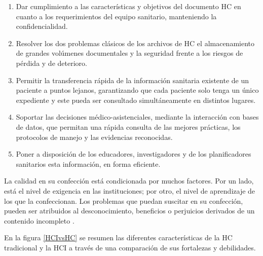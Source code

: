 \begin{enumerate}
	\item Dar cumplimiento a las características y objetivos del documento HC en cuanto a los requerimientos del equipo sanitario, manteniendo la confidencialidad.  
	
	\item Resolver los dos problemas clásicos de los archivos de HC el almacenamiento de grandes volúmenes documentales y la seguridad frente a los riesgos de pérdida y de deterioro.  
	
	\item Permitir la transferencia rápida de la información sanitaria existente de un paciente a puntos lejanos, garantizando que cada paciente solo tenga un único expediente y este pueda ser consultado simultáneamente en distintos lugares.  
	
	\item Soportar las decisiones médico-asistenciales, mediante la interacción con bases de datos, que permitan una rápida consulta de las mejores prácticas, los protocolos de manejo y las evidencias reconocidas.  
	
	\item Poner a disposición de los educadores, investigadores y de los planificadores sanitarios esta información, en forma eficiente. 
\end{enumerate}

La calidad en su confección está condicionada por muchos factores. Por un lado, está el nivel de exigencia en las instituciones; por otro, el nivel de aprendizaje de los que la confeccionan. Los problemas que puedan suscitar en su confección, pueden ser atribuidos al desconocimiento, beneficios o perjuicios derivados de un contenido incompleto  .

En la figura \ref{HCIvsHC} se resumen las diferentes características de la HC tradicional y la HCI a través de una comparación de sus fortalezas y debilidades.

